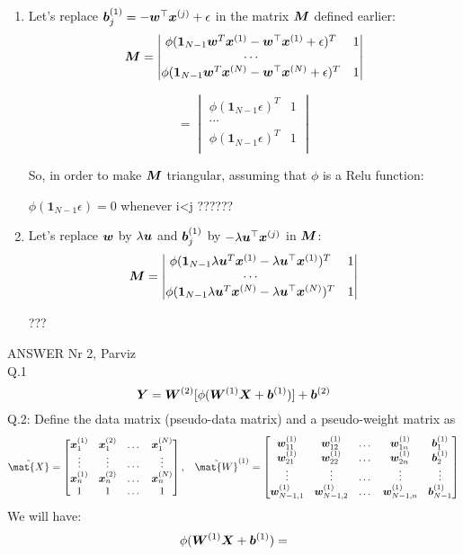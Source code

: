 {\begin{enumerate}
where:
$$
\mM =
\begin{vmatrix}
\phi(\bm{1}_{N-1} \vw^T \vx^{(1)}+\vb^{(1)})^T&1\\
\cdots\\
\phi(\bm{1}_{N-1} \vw^T \vx^{(N)}+\vb^{(1)})^T&1\\
\end{vmatrix}$$

\item  Let's replace ${\bm{b}}^{(1)}_j = -{\bm{w}}^\top {\bm{x}}^{(j)} + \epsilon$ in the matrix ${\bm{M}}$ defined earlier:
$${\bm{M}} = 
\begin{vmatrix}
\phi(\bm{1}_{N-1} {\bm{w}}^T {\bm{x}}^{(1)}-{\bm{w}}^\top {\bm{x}}^{(1)} + \epsilon)^T&1\\
\cdots\\
\phi(\bm{1}_{N-1} {\bm{w}}^T {\bm{x}}^{(N)}-{\bm{w}}^\top {\bm{x}}^{(N)} + \epsilon)^T&1\\
\end{vmatrix}
$$

$$= 
\begin{vmatrix}
\phi(\bm{1}_{N-1} \epsilon)^T&1\\
\cdots\\
\phi(\bm{1}_{N-1} \epsilon)^T&1\\
\end{vmatrix}
$$

So, in order to make ${\bm{M}}$ triangular, assuming that $\phi$ is a Relu function:

$\phi({\bm{1}}_{N-1} \epsilon) = 0$ whenever i<j ??????

\item Let's replace ${\bm{w}}$ by $\lambda{\bm{u}}$ and ${\bm{b}}^{(1)}_j$ by $-\lambda {\bm{u}}^\top {\bm{x}}^{(j)}$ in ${\bm{M}}$:
$${\bm{M}} = 
\begin{vmatrix}
\phi(\bm{1}_{N-1} \lambda{\bm{u}}^T {\bm{x}}^{(1)}-\lambda {\bm{u}}^\top {\bm{x}}^{(1)})^T&1\\
\cdots\\
\phi(\bm{1}_{N-1} \lambda{\bm{u}}^T {\bm{x}}^{(N)}-\lambda {\bm{u}}^\top {\bm{x}}^{(N)})^T&1\\
\end{vmatrix}
$$

???

\end{enumerate}

{ANSWER Nr 2, Parviz}\\
Q.1
$$\mY = \mW^{(2)} [\phi(\mW^{(1)} \mX + \vb^{(1)})] + \vb^{(2)}$$
Q.2: Define the data matrix (pseudo-data matrix) and a pseudo-weight matrix as
$$
\tilde{\mat{X}}=
  \begin{bmatrix}
  \vx^{(1)}_1&\vx^{(2)}_1&\dots&\vx^{(N)}_1\\
  \vdots&\vdots&\dots&\vdots\\
  \vx^{(1)}_n&\vx^{(2)}_n&\dots&\vx^{(N)}_n\\
  1&1&\dots&1  
  \end{bmatrix},\;\;\;
  \tilde{\mat{W}}^{(1)}=
  \begin{bmatrix}
  \vw^{(1)}_{11}&\vw^{(1)}_{12}&\dots&\vw^{(1)}_{1n}&\vb^{(1)}_1\\
  \vw^{(1)}_{21}&\vw^{(1)}_{22}&\dots&\vw^{(1)}_{2n}&\vb^{(1)}_2\\
  \vdots&\vdots&\dots&\vdots&\vdots\\
 
  \vw^{(1)}_{N-1,1}&\vw^{(1)}_{N-1,2}&\dots&\vw^{(1)}_{N-1,n}&\vb^{(1)}_{N-1}
  \end{bmatrix}
$$
We will have:
$$
\phi(\mW^{(1)} \mX + \vb^{(1)})=
$$
}
